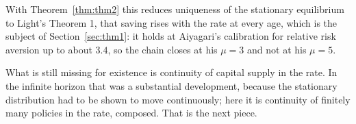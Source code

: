 With Theorem~\ref{thm:thm2} this reduces uniqueness of the stationary equilibrium to Light's
Theorem 1, that saving rises with the rate at every age, which is the subject of
Section~\ref{sec:thm1}: it holds at Aiyagari's calibration for relative risk aversion up to about
$3.4$, so the chain closes at his $\mu=3$ and not at his $\mu=5$.

What is still missing for existence is continuity of capital supply in the rate. In the
infinite horizon that was a substantial development, because the stationary distribution had to
be shown to move continuously; here it is continuity of finitely many policies in the rate,
composed. That is the next piece.
